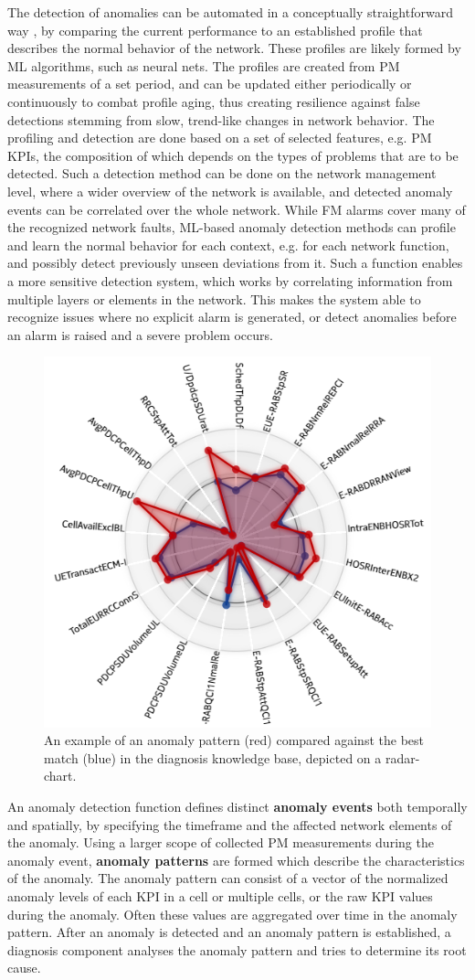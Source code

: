 			The detection of anomalies can be automated in a conceptually straightforward way \cite{anonamly_det}, by comparing the current performance to an established profile that describes the normal behavior of the network.
			These profiles are likely formed by \ac{ML} algorithms, such as neural nets.
			The profiles are created from \ac{PM} measurements of a set period, and can be updated either periodically or continuously to combat profile aging, thus creating resilience against false detections stemming from slow, trend-like changes in network behavior.
			The profiling and detection are done based on a set of selected features, e.g. \ac{PM} \acp{KPI}, the composition of which depends on the types of problems that are to be detected.
			Such a detection method can be done on the network management level, where a wider overview of the network is available, and detected anomaly events can be correlated over the whole network.
			While \ac{FM} alarms cover many of the recognized network faults, \ac{ML}-based anomaly detection methods can profile and learn the normal behavior for each context, e.g. for each network function, and possibly detect previously unseen deviations from it.
			Such a function enables a more sensitive detection system, which works by correlating information from multiple layers or elements in the network.
			This makes the system able to recognize issues where no explicit alarm is generated, or detect anomalies before an alarm is raised and a severe problem occurs.
			
			\begin{figure}[ht]
				\centering
				\includegraphics[width=0.4\linewidth]{figures/03_quantization/anomaly_pattern/anomaly_pattern.png}
				\caption[Anomaly pattern examples]{An example of an anomaly pattern (red) compared against the best match (blue) in the diagnosis knowledge base, depicted on a radar-chart.}
				\label{fig:anomaly_pattern}
			\end{figure}
			
			An anomaly detection function defines distinct \textbf{anomaly events} both temporally and spatially, by specifying the timeframe and the affected network elements of the anomaly.
			Using a larger scope of collected \ac{PM} measurements during the anomaly event, \textbf{anomaly patterns} are formed which describe the characteristics of the anomaly.
			The anomaly pattern can consist of a vector of the normalized anomaly levels of each \ac{KPI} in a cell or multiple cells, or the raw \ac{KPI} values during the anomaly.
			Often these values are aggregated over time in the anomaly pattern.		 	
			After an anomaly is detected and an anomaly pattern is established, a diagnosis component analyses the anomaly pattern and tries to determine its root cause.
					
